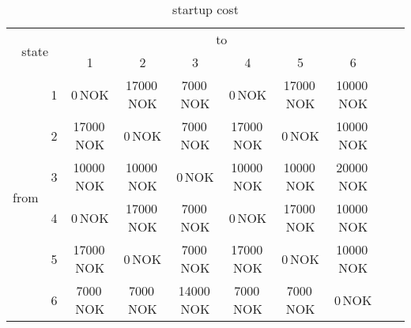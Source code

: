 \documentclass{article}
\begin{document}
	\begin{table}[hbt!]
\begin{center}
\begin{tabular}[h]{|c|c||c|c|c|c|c|c|c|c|}
\hline 
\multicolumn{2}{|c|}{\multirow{2}{*}{state}}&\multicolumn{6}{|c|}{to}\\
		\cline{3-8}
    \multicolumn{2}{|c|}{}&1 & 2 & 3 & 4 & 5 & 6 \\
\hline
\hline
\multirow{6}{*}{from}
	& 1 & 0\,NOK 		& 17000\,NOK 	& 7000\,NOK 	& 0\,NOK 		& 17000\,NOK 		& 10000\,NOK\\
	\cline{3-8}
	& 2 & 17000\,NOK 	& 0\,NOK 		& 7000\,NOK 	& 17000\,NOK 	& 0\,NOK 			& 10000\,NOK\\
	\cline{3-8}
	& 3 & 10000\,NOK 	& 10000\,NOK 	& 0\,NOK 		& 10000\,NOK 	& 10000\,NOK 		& 20000\,NOK\\
	\cline{3-8}
	& 4 & 0\,NOK 		& 17000\,NOK 	& 7000\,NOK 	& 0\,NOK 		& 17000\,NOK 		& 10000\,NOK\\
	\cline{3-8}
	& 5 & 17000\,NOK 	& 0\,NOK 		& 7000\,NOK 	& 17000\,NOK 	& 0\,NOK 			& 10000\,NOK\\
	\cline{3-8}
	& 6 & 7000\,NOK 	& 7000\,NOK 	& 14000\,NOK 	& 7000\,NOK 	& 7000\,NOK 		& 0\,NOK\\
\hline
\end{tabular}
\caption{startup cost}\label{tab:startcost}
\end{center}
\end{table}
\end{document}
